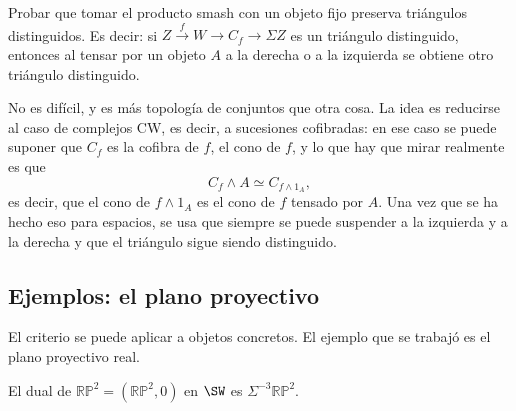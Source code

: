 \begin{ejer}
Probar que tomar el producto smash con un objeto fijo preserva triángulos distinguidos. Es decir: si $Z\xrightarrow{\ f\ }W\xrightarrow{\ }C_f\xrightarrow{\ }\Sigma Z$ es un triángulo distinguido, entonces al tensar por un objeto $A$ a la derecha o a la izquierda se obtiene otro triángulo distinguido.
\end{ejer}

\begin{sol}
No es difícil, y es más topología de conjuntos que otra cosa. La idea es reducirse al caso de complejos CW, es decir, a sucesiones cofibradas: en ese caso se puede suponer que $C_f$ es la cofibra de $f$, el cono de $f$, y lo que hay que mirar realmente es que
\[
C_f\wedge A\simeq C_{f\wedge1_A},
\]
es decir, que el cono de $f\wedge1_A$ es el cono de $f$ tensado por $A$. Una vez que se ha hecho eso para espacios, se usa que siempre se puede suspender a la izquierda y a la derecha y que el triángulo sigue siendo distinguido.
\end{sol}

\subsection{Ejemplos: el plano proyectivo}

El criterio se puede aplicar a objetos concretos. El ejemplo que se trabajó es el plano proyectivo real.

\begin{ejem}\label{ejem:rp2-dual}
El dual de $\mathbb{RP}^2=(\mathbb{RP}^2,0)$ en $\SW$ es $\Sigma^{-3}\mathbb{RP}^2$.
\end{ejem}

